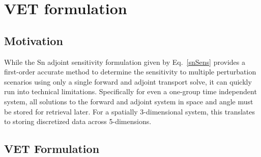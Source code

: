 \documentclass{article}
\begin{document}
\section{VET formulation}

\subsection{Motivation} 

While the Sn adjoint sensitivity formulation given by Eq.~\eqref{snSens} provides a first-order accurate method to determine the sensitivity to multiple perturbation scenarios using only a single forward and adjoint transport solve, it can quickly run into technical limitations. Specifically for even a one-group time independent system, all solutions to the forward and adjoint system in space and angle must be stored for retrieval later. For a spatially 3-dimensional system, this translates to storing discretized data across 5-dimensions.


\subsection{VET Formulation}
\end{document}
